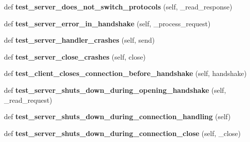 \begin{DoxyCompactItemize}
def {\bfseries test\+\_\+server\+\_\+does\+\_\+not\+\_\+switch\+\_\+protocols} (self, \+\_\+read\+\_\+response)
\item 
\mbox{\label{classwebsockets_1_1test__client__server_1_1_client_server_tests_a87bc94879d032e4ce7eee8505a920393}} 
def {\bfseries test\+\_\+server\+\_\+error\+\_\+in\+\_\+handshake} (self, \+\_\+process\+\_\+request)
\item 
\mbox{\label{classwebsockets_1_1test__client__server_1_1_client_server_tests_aa0afd51907c9572fddbb1193b8199360}} 
def {\bfseries test\+\_\+server\+\_\+handler\+\_\+crashes} (self, send)
\item 
\mbox{\label{classwebsockets_1_1test__client__server_1_1_client_server_tests_a149cc4bf1c90740e7e00ec0df9083546}} 
def {\bfseries test\+\_\+server\+\_\+close\+\_\+crashes} (self, close)
\item 
\mbox{\label{classwebsockets_1_1test__client__server_1_1_client_server_tests_ae393d42ae3cb8483948a66be3a35595f}} 
def {\bfseries test\+\_\+client\+\_\+closes\+\_\+connection\+\_\+before\+\_\+handshake} (self, handshake)
\item 
\mbox{\label{classwebsockets_1_1test__client__server_1_1_client_server_tests_aa6218048e967127f818d290f80df5c1e}} 
def {\bfseries test\+\_\+server\+\_\+shuts\+\_\+down\+\_\+during\+\_\+opening\+\_\+handshake} (self, \+\_\+read\+\_\+request)
\item 
\mbox{\label{classwebsockets_1_1test__client__server_1_1_client_server_tests_a3c24f1c6d039591608225f81d7a0062d}} 
def {\bfseries test\+\_\+server\+\_\+shuts\+\_\+down\+\_\+during\+\_\+connection\+\_\+handling} (self)
\item 
\mbox{\label{classwebsockets_1_1test__client__server_1_1_client_server_tests_aaa0a8ace8689dbf65ba0bb1a4c0b079e}} 
def {\bfseries test\+\_\+server\+\_\+shuts\+\_\+down\+\_\+during\+\_\+connection\+\_\+close} (self, \+\_\+close)

\end{DoxyCompactItemize}

